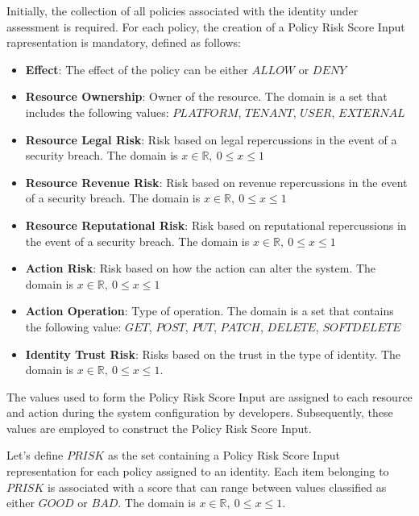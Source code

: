 Initially, the collection of all policies associated with the identity under assessment is required. 
For each policy, the creation of a Policy Risk Score Input rapresentation is mandatory, defined as follows:
\begin{itemize}
    \item \textbf{Effect}: The effect of the policy can be either $ALLOW$ or $DENY$
    \item \textbf{Resource Ownership}: Owner of the resource. The domain is a set that includes the following values: $PLATFORM$, $TENANT$, $USER$, $EXTERNAL$
    \item \textbf{Resource Legal Risk}: Risk based on legal repercussions in the event of a security breach. The domain is \( x \in \mathbb{R}, \ 0 \leq x \leq 1 \)
    \item \textbf{Resource Revenue Risk}: Risk based on revenue repercussions in the event of a security breach. The domain is \( x \in \mathbb{R}, \ 0 \leq x \leq 1 \)
    \item \textbf{Resource Reputational Risk}: Risk based on reputational repercussions in the event of a security breach. The domain is \( x \in \mathbb{R}, \ 0 \leq x \leq 1 \)
    \item \textbf{Action Risk}: Risk based on how the action can alter the system. The domain is \( x \in \mathbb{R}, \ 0 \leq x \leq 1 \)
    \item \textbf{Action Operation}: Type of operation. The domain is a set that contains the following value: $GET$, $POST$, $PUT$, $PATCH$, $DELETE$, $SOFTDELETE$
    \item \textbf{Identity Trust Risk}: Risks based on the trust in the type of identity. The domain is \( x \in \mathbb{R}, \ 0 \leq x \leq 1 \).
\end{itemize}

\vspace{15pt}

The values used to form the Policy Risk Score Input are assigned to each resource and action during the system configuration by developers. 
Subsequently, these values are employed to construct the Policy Risk Score Input.

\vspace{15pt}

Let's define $PRISK$ as the set containing a Policy Risk Score Input representation for each policy assigned to an identity. Each item belonging to $PRISK$ is associated with a score that can range between values classified as either $GOOD$ or $BAD$.
The domain is \( x \in \mathbb{R}, \ 0 \leq x \leq 1 \).

